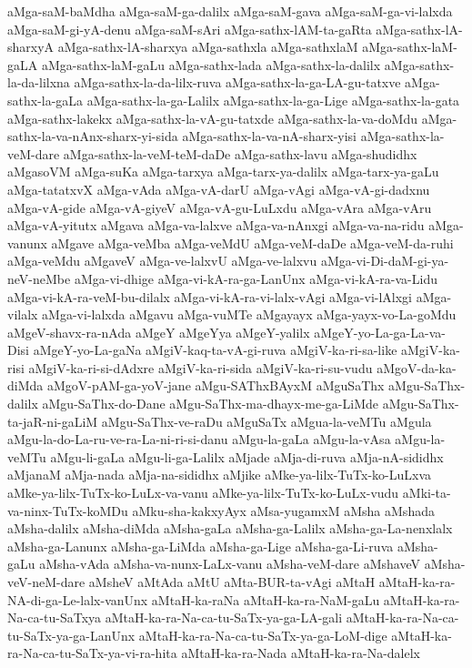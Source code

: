 {aMga-saM-baMdha
aMga-saM-ga-dalilx
aMga-saM-gava
aMga-saM-ga-vi-lalxda
aMga-saM-gi-yA-denu
aMga-saM-sAri
aMga-sathx-lAM-ta-gaRta
aMga-sathx-lA-sharxyA
aMga-sathx-lA-sharxya
aMga-sathxla
aMga-sathxlaM
aMga-sathx-laM-gaLA
aMga-sathx-laM-gaLu
aMga-sathx-lada
aMga-sathx-la-dalilx
aMga-sathx-la-da-lilxna
aMga-sathx-la-da-lilx-ruva
aMga-sathx-la-ga-LA-gu-tatxve
aMga-sathx-la-gaLa
aMga-sathx-la-ga-Lalilx
aMga-sathx-la-ga-Lige
aMga-sathx-la-gata
aMga-sathx-lakekx
aMga-sathx-la-vA-gu-tatxde
aMga-sathx-la-va-doMdu
aMga-sathx-la-va-nAnx-sharx-yi-sida
aMga-sathx-la-va-nA-sharx-yisi
aMga-sathx-la-veM-dare
aMga-sathx-la-veM-teM-daDe
aMga-sathx-lavu
aMga-shudidhx
aMgasoVM
aMga-suKa
aMga-tarxya
aMga-tarx-ya-dalilx
aMga-tarx-ya-gaLu
aMga-tatatxvX
aMga-vAda
aMga-vA-darU
aMga-vAgi
aMga-vA-gi-dadxnu
aMga-vA-gide
aMga-vA-giyeV
aMga-vA-gu-LuLxdu
aMga-vAra
aMga-vAru
aMga-vA-yitutx
aMgava
aMga-va-lalxve
aMga-va-nAnxgi
aMga-va-na-ridu
aMga-vanunx
aMgave
aMga-veMba
aMga-veMdU
aMga-veM-daDe
aMga-veM-da-ruhi
aMga-veMdu
aMgaveV
aMga-ve-lalxvU
aMga-ve-lalxvu
aMga-vi-Di-daM-gi-ya-neV-neMbe
aMga-vi-dhige
aMga-vi-kA-ra-ga-LanUnx
aMga-vi-kA-ra-va-Lidu
aMga-vi-kA-ra-veM-bu-dilalx
aMga-vi-kA-ra-vi-lalx-vAgi
aMga-vi-lAlxgi
aMga-vilalx
aMga-vi-lalxda
aMgavu
aMga-vuMTe
aMgayayx
aMga-yayx-vo-La-goMdu
aMgeV-shavx-ra-nAda
aMgeY
aMgeYya
aMgeY-yalilx
aMgeY-yo-La-ga-La-va-Disi
aMgeY-yo-La-gaNa
aMgiV-kaq-ta-vA-gi-ruva
aMgiV-ka-ri-sa-like
aMgiV-ka-risi
aMgiV-ka-ri-si-dAdxre
aMgiV-ka-ri-sida
aMgiV-ka-ri-su-vudu
aMgoV-da-ka-diMda
aMgoV-pAM-ga-yoV-jane
aMgu-SAThxBAyxM
aMguSaThx
aMgu-SaThx-dalilx
aMgu-SaThx-do-Dane
aMgu-SaThx-ma-dhayx-me-ga-LiMde
aMgu-SaThx-ta-jaR-ni-gaLiM
aMgu-SaThx-ve-raDu
aMguSaTx
aMgua-la-veMTu
aMgula
aMgu-la-do-La-ru-ve-ra-La-ni-ri-si-danu
aMgu-la-gaLa
aMgu-la-vAsa
aMgu-la-veMTu
aMgu-li-gaLa
aMgu-li-ga-Lalilx
aMjade
aMja-di-ruva
aMja-nA-sididhx
aMjanaM
aMja-nada
aMja-na-sididhx
aMjike
aMke-ya-lilx-TuTx-ko-LuLxva
aMke-ya-lilx-TuTx-ko-LuLx-va-vanu
aMke-ya-lilx-TuTx-ko-LuLx-vudu
aMki-ta-va-ninx-TuTx-koMDu
aMku-sha-kakxyAyx
aMsa-yugamxM
aMsha
aMshada
aMsha-dalilx
aMsha-diMda
aMsha-gaLa
aMsha-ga-Lalilx
aMsha-ga-La-nenxlalx
aMsha-ga-Lanunx
aMsha-ga-LiMda
aMsha-ga-Lige
aMsha-ga-Li-ruva
aMsha-gaLu
aMsha-vAda
aMsha-va-nunx-LaLx-vanu
aMsha-veM-dare
aMshaveV
aMsha-veV-neM-dare
aMsheV
aMtAda
aMtU
aMta-BUR-ta-vAgi
aMtaH
aMtaH-ka-ra-NA-di-ga-Le-lalx-vanUnx
aMtaH-ka-raNa
aMtaH-ka-ra-NaM-gaLu
aMtaH-ka-ra-Na-ca-tu-SaTxya
aMtaH-ka-ra-Na-ca-tu-SaTx-ya-ga-LA-gali
aMtaH-ka-ra-Na-ca-tu-SaTx-ya-ga-LanUnx
aMtaH-ka-ra-Na-ca-tu-SaTx-ya-ga-LoM-dige
aMtaH-ka-ra-Na-ca-tu-SaTx-ya-vi-ra-hita
aMtaH-ka-ra-Nada
aMtaH-ka-ra-Na-dalelx
}
